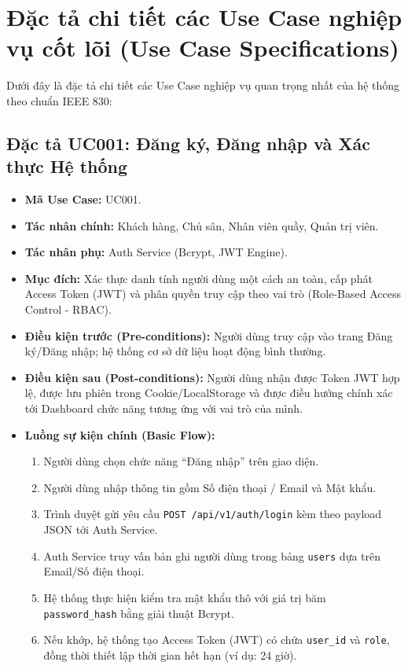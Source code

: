 \section{Đặc tả chi tiết các Use Case nghiệp vụ cốt lõi (Use Case Specifications)}
\label{sec:dacta_usecases}

Dưới đây là đặc tả chi tiết các Use Case nghiệp vụ quan trọng nhất của hệ thống theo chuẩn IEEE 830:

\subsection{Đặc tả UC001: Đăng ký, Đăng nhập và Xác thực Hệ thống}
\begin{itemize}[leftmargin=1.5cm]
    \item \textbf{Mã Use Case:} UC001.
    \item \textbf{Tác nhân chính:} Khách hàng, Chủ sân, Nhân viên quầy, Quản trị viên.
    \item \textbf{Tác nhân phụ:} Auth Service (Bcrypt, JWT Engine).
    \item \textbf{Mục đích:} Xác thực danh tính người dùng một cách an toàn, cấp phát Access Token (JWT) và phân quyền truy cập theo vai trò (Role-Based Access Control - RBAC).
    \item \textbf{Điều kiện trước (Pre-conditions):} Người dùng truy cập vào trang Đăng ký/Đăng nhập; hệ thống cơ sở dữ liệu hoạt động bình thường.
    \item \textbf{Điều kiện sau (Post-conditions):} Người dùng nhận được Token JWT hợp lệ, được lưu phiên trong Cookie/LocalStorage và được điều hướng chính xác tới Dashboard chức năng tương ứng với vai trò của mình.
    \item \textbf{Luồng sự kiện chính (Basic Flow):}
    \begin{enumerate}
        \item Người dùng chọn chức năng ``Đăng nhập'' trên giao diện.
        \item Người dùng nhập thông tin gồm Số điện thoại / Email và Mật khẩu.
        \item Trình duyệt gửi yêu cầu \texttt{POST /api/v1/auth/login} kèm theo payload JSON tới Auth Service.
        \item Auth Service truy vấn bản ghi người dùng trong bảng \texttt{users} dựa trên Email/Số điện thoại.
        \item Hệ thống thực hiện kiểm tra mật khẩu thô với giá trị băm \texttt{password\_hash} bằng giải thuật Bcrypt.
        \item Nếu khớp, hệ thống tạo Access Token (JWT) có chứa \texttt{user\_id} và \texttt{role}, đồng thời thiết lập thời gian hết hạn (ví dụ: 24 giờ).

\end{enumerate}
\end{itemize}
